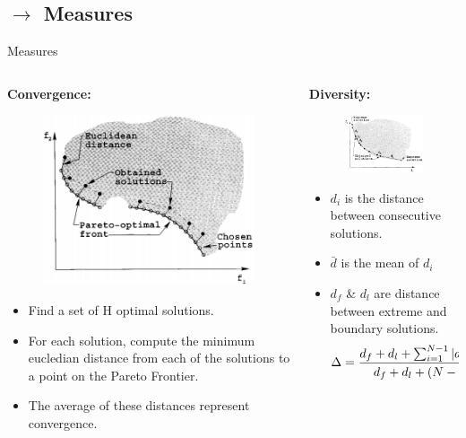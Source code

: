 \documentclass[10pt]{beamer}
\begin{document}
\subsection{$\rightarrow$ Measures}
\begin{frame}{Measures}
\begin{columns}[t]
    \begin{column}{0.5\linewidth}
    \textbf{Convergence:}
    \begin{figure}
        \centering
        \includegraphics[scale=0.35]{figures/convergence}
        \label{fig:convergence}
    \end{figure}
    \footnotesize{\begin{itemize}
    \item Find a set of H optimal solutions.
    \item For each solution, compute the minimum eucledian distance from each of the solutions to a point on the Pareto Frontier.
    \item The average of these distances represent convergence.
    \end{itemize}}
    \end{column}
    \begin{column}{0.5\linewidth}
    \textbf{Diversity:}
    \begin{figure}
        \centering
        \includegraphics[scale=0.35]{figures/diversity}
        \label{fig:diversity}
    \end{figure}
    \footnotesize{\begin{itemize}
    \item $d_i$ is the distance between consecutive solutions.
    \item $\bar{d}$ is the mean of $d_i$ 
    \item $d_f$ \& $d_l$ are distance between extreme and boundary solutions.
    \[\Delta = {{d_f + d_l + \sum_{i=1}^{N-1}|d_i-\bar{d}|}\over{d_f + d_l + (N-1)\bar{d}}}\]
    \end{itemize}}
    \end{column}
\end{columns}
\end{frame}
\end{document}
